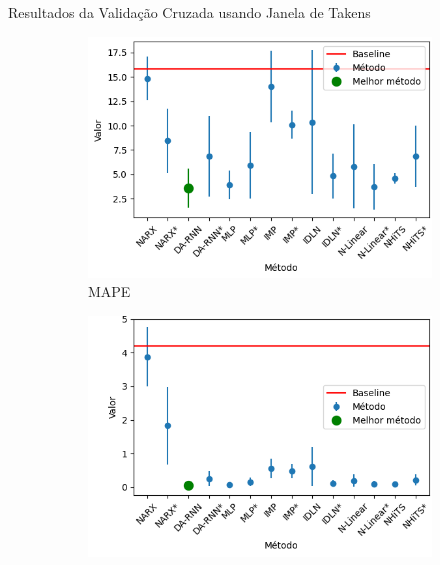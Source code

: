 \begin{table}[ht]
	\centering
	\caption{Resultados da Validação Cruzada usando Janela de Takens}
	\label{tab:resultados_validacao_takens}
	\begin{adjustbox}{angle=90, scale=0.63}
		
	\end{adjustbox}
\end{table}
\begin{figure}[htbp]
	\centering
	\begin{subfigure}[b]{0.3\textwidth}
		\centering
		\includegraphics[width=\textwidth]{figuras/mape_takens_brasil_results.png}
		\caption{\ac{MAPE}}
		\label{fig:mape_takens_brasil_results}
	\end{subfigure}
	\hfill
	\begin{subfigure}[b]{0.3\textwidth}
		\centering
		\includegraphics[width=\textwidth]{figuras/sle_takens_brasil_results.png}

\end{subfigure}
\end{figure}
